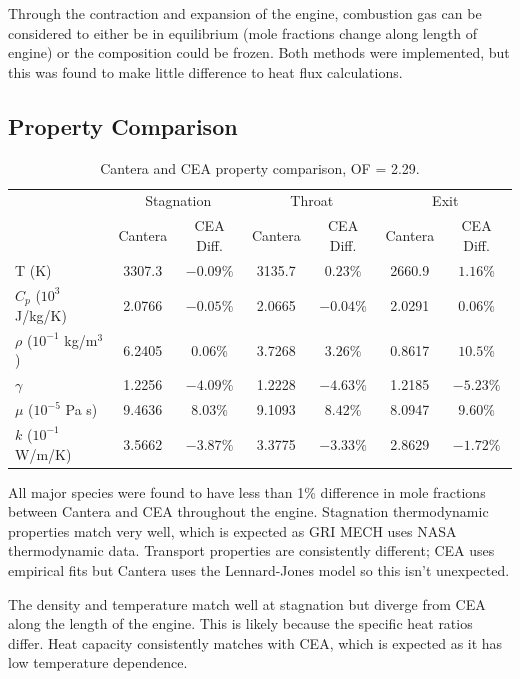 \documentclass[11pt]{article}
\begin{document}
Through the contraction and expansion of the engine, combustion gas can be considered to either be in equilibrium (mole fractions change along length of engine) or the composition could be frozen. Both methods were implemented, but this was found to make little difference to heat flux calculations.


\subsection{Property Comparison}

\begin{table}[H]
  \centering
  \caption{Cantera and CEA property comparison, OF = 2.29.}
  \begin{tabular}{l c c c c c c}
    \toprule
    & \multicolumn{2}{c}{Stagnation} & \multicolumn{2}{c}{Throat} & \multicolumn{2}{c}{Exit} \\
    \cmidrule(lr){2-3} \cmidrule(lr){4-5} \cmidrule(lr){6-7}
    & Cantera & CEA Diff. & Cantera & CEA Diff. & Cantera & CEA Diff. \\
    \midrule
    T (K) & 3307.3 & $-0.09\%$ & 3135.7 & $0.23\%$ & 2660.9 & $1.16\%$ \\
    $C_p$ ($10^3$ J/kg/K) & 2.0766 & $-0.05\%$ & 2.0665 & $-0.04\%$ & 2.0291 & $0.06\%$ \\
    $\rho$ ($10^{-1}$ kg/m$^3$) & 6.2405 & $0.06\%$ & 3.7268 & $3.26\%$ & 0.8617 & $10.5\%$\\
    $\gamma$ & 1.2256 & $-4.09\%$ & 1.2228 & $-4.63\%$ & 1.2185 & $-5.23\%$ \\
    $\mu$ ($10^{-5}$ Pa s) & 9.4636 & $8.03\%$ & 9.1093 & $8.42\%$ & 8.0947 & $9.60\%$ \\
    $k$ ($10^{-1}$ W/m/K) & 3.5662 & $-3.87\%$ & 3.3775 & $-3.33\%$ & 2.8629 & $-1.72\%$\\
    \bottomrule
  \end{tabular}
\end{table}

All major species were found to have less than 1\% difference in mole fractions between Cantera and CEA throughout the engine. Stagnation thermodynamic properties match very well, which is expected as GRI MECH uses NASA thermodynamic data. Transport properties are consistently different; CEA uses empirical fits but Cantera uses the Lennard-Jones model so this isn't unexpected.

The density and temperature match well at stagnation but diverge from CEA along the length of the engine. This is likely because the specific heat ratios differ. Heat capacity consistently matches with CEA, which is expected as it has low temperature dependence.
\end{document}
